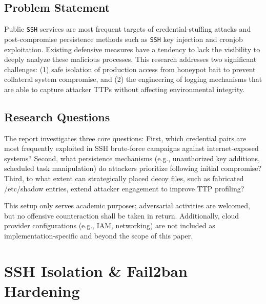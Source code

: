 \documentclass{cls/ULBreport}
\begin{document}
        \subsection{Problem Statement} 
        Public \texttt{SSH} services are most frequent targets of credential-stuffing attacks and post-compromise persistence methods such as \texttt{SSH} key injection and cronjob exploitation. Existing defensive measures have a tendency to lack the visibility to deeply analyze these malicious processes. This research addresses two significant challenges: (1) safe isolation of production access from honeypot bait to prevent collateral system compromise, and (2) the engineering of logging mechanisms that are able to capture attacker TTPs without affecting environmental integrity.

        \subsection{Research Questions}
        The report investigates three core questions: First, which credential pairs are most frequently exploited in SSH brute-force campaigns against internet-exposed systems? Second, what persistence mechanisms (e.g., unauthorized key additions, scheduled task manipulation) do attackers prioritize following initial compromise? Third, to what extent can strategically placed decoy files, such as fabricated /etc/shadow entries, extend attacker engagement to improve TTP profiling?

    \begin{tcolorbox}[  
        colback=red!5!white,  
        colframe=red!75!black,  
        title={\textbf{\textcolor{black}{Security Disclaimer}}},
        fontupper=\small,  
        sharp corners  
    ]  
    This setup only serves academic purposes; adversarial activities are welcomed, but no offensive counteraction shall be taken in return. Additionally, cloud provider configurations (e.g., IAM, networking) are not included as implementation-specific and beyond the scope of this paper.  
    \end{tcolorbox}  

        
    \section{SSH Isolation \& Fail2ban Hardening}
\end{document}
